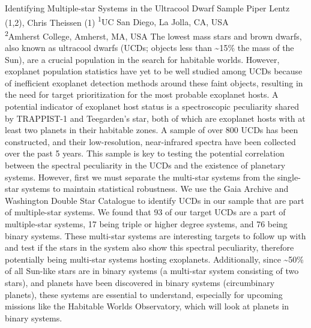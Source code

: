 \makeabstract
{
Identifying Multiple-star Systems in the Ultracool Dwarf Sample
}
{
Piper Lentz (1,2), Chris Theissen (1)
}
{
\textsuperscript{1}UC San Diego, La Jolla, CA, USA\\
\textsuperscript{2}Amherst College, Amherst, MA, USA
}
{
The lowest mass stars and brown dwarfs, also known as ultracool dwarfs (UCDs; objects less than \textasciitilde{}15\% the mass of the Sun), are a crucial population in the search for habitable worlds. However, exoplanet population statistics have yet to be well studied among UCDs because of inefficient exoplanet detection methods around these faint objects, resulting in the need for target prioritization for the most probable exoplanet hosts. A potential indicator of exoplanet host status is a spectroscopic peculiarity shared by TRAPPIST-1 and Teegarden’s star, both of which are exoplanet hosts with at least two planets in their habitable zones.
}
{
A sample of over 800 UCDs has been constructed, and their low-resolution, near-infrared spectra have been collected over the past 5 years. This sample is key to testing the potential correlation between the spectral peculiarity in the UCDs and the existence of planetary systems. However, first we must separate the multi-star systems from the single-star systems to maintain statistical robustness. We use the Gaia Archive and Washington Double Star Catalogue to identify UCDs in our sample that are part of multiple-star systems.
}
{
We found that 93 of our target UCDs are a part of multiple-star systems, 17 being triple or higher degree systems, and 76 being binary systems.
}
{
These multi-star systems are interesting targets to follow up with and test if the stars in the system also show this spectral peculiarity, therefore potentially being multi-star systems hosting exoplanets. Additionally, since \textasciitilde{}50\% of all Sun-like stars are in binary systems (a multi-star system consisting of two stars), and planets have been discovered in binary systems (circumbinary planets), these systems are essential to understand, especially for upcoming missions like the Habitable Worlds Observatory, which will look at planets in binary systems.
}

\newpage
